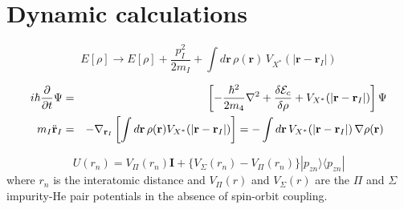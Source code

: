 \documentclass[12pt,a4paper]{book}
\begin{document}
	\section{Dynamic calculations}
	
	\begin{equation}
	E[\rho] \rightarrow E[\rho] + \frac{p^2_I}{2 m_I} + \int d \mathbf{r} \, \rho(\mathbf{r}) \,  V_{X^*}(|\mathbf{r}- \mathbf{r}_I|) 
	\label{eq33}
	\end{equation}
	
	\begin{eqnarray}
	i\hbar\frac{\partial}{\partial t} \Psi
	&=&
	\left[
	-\frac{\hbar^2}{2m_4} \nabla^2 +
	\frac{\delta {\cal E}_c}{\delta \rho}
	+
	V_{X^*}(|\mathbf{r}- \mathbf{r}_I|)
	\right]
	\Psi
	\nonumber
	\\
	m_I \ddot{\mathbf{r}}_I
	&=&
	- \nabla_{\mathbf{r}_I}
	\left[  \int d \mathbf{r} \,\rho(\mathbf{r}) V_{X^*}(|\mathbf{r}- \mathbf{r}_I|)  \right]  =
	-  \int d \mathbf{r} \, V_{X^*}(|\mathbf{r}- \mathbf{r}_I|)  \, \nabla \rho(\mathbf{r})  
	\;
	\label{eq34}
	\end{eqnarray}
	
	\begin{equation}
	U(r_n)= 
	V_{\Pi}(r_n)\mathbf{I}+\{V_{\Sigma}(r_n)-V_{\Pi}(r_n)\}|p_{zn}\rangle\langle p_{zn} |  
	\label{eq37}
	\end{equation}
	where $r_n$ is the interatomic distance and $V_\Pi(r)$ and $V_\Sigma(r)$ are the $\Pi$ and $\Sigma$ impurity-He pair potentials in the absence of spin-orbit coupling.
	
\end{document}
